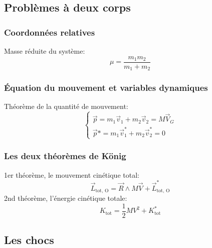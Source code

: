 \documentclass{article}
\numberwithin{equation}{section}
\begin{document}
\subsection{Problèmes à deux corps}

\subsubsection{Coordonnées relatives} %
Masse réduite du système:
\begin{equation}
	\boxed{ \mu = \frac{m_1m_2}{m_1 + m_2} }
\end{equation}

\subsubsection{Équation du mouvement et variables dynamiques} %
Théorème de la quantité de mouvement:
\begin{equation}
	\begin{cases}
		\vec p = m_1 \vec v_1 + m_2 \vec v_2 = M \vec V_G \\
		\vec p * = m_1 \vec v_1^* + m_2 \vec v_2^* = 0
	\end{cases}
\end{equation}

\subsubsection{Les deux théorèmes de König}
1er théorème, le mouvement cinétique total:
\begin{equation}
	\boxed{ \vec L_\text{tot, O} = \vec R \wedge M \vec V + \vec L_\text{tot, O}^* }
\end{equation}
2nd théorème, l'énergie cinétique totale:
\begin{equation}
	\boxed{ K_\text{tot} = \frac{1}{2}MV^2 + K_\text{tot}^* }
\end{equation}

\subsection{Les chocs}
\end{document}
